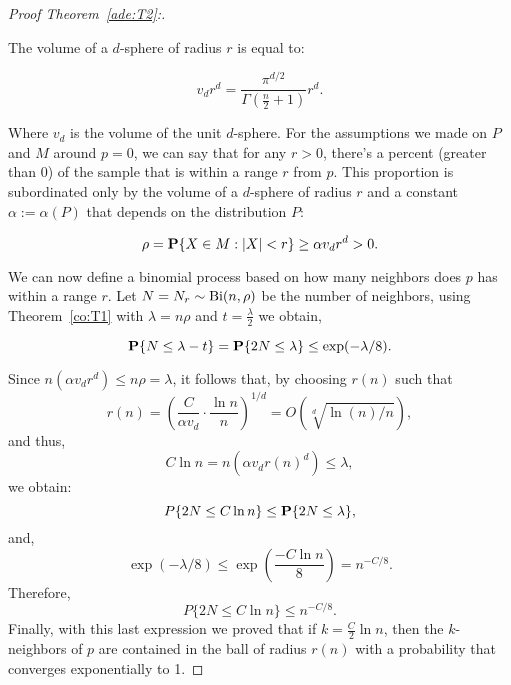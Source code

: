 \begin{proof}[Proof Theorem~\ref{ade:T2}:]\label{ade:T2P}

The volume of a $d$-sphere of radius $r$ is equal to:

\[ v_d r^d = \frac{\pi^{d/2}}{\Gamma(\tfrac{n}{2}+1)} r^d. \]

Where $v_d$ is the volume of the unit $d$-sphere. For the assumptions we made on $P$ and $M$ around $p = 0$, we can say that for any $r > 0$, there's a percent (greater than 0) of the sample that is within a range $r$ from $p$. This proportion is subordinated only by the volume of a $d$-sphere of radius $r$ and a constant $\alpha := \alpha(P)$ that depends on the distribution $P$:

\[ \rho = \P\{X \in M : |X| < r\} \geq \alpha v_d r^d  > 0.  \] 

We can now define a binomial process based on how many neighbors does $p$ has within a range $r$. Let $N = N_r \sim \Bi(n,\rho)$ be the number of neighbors, using Theorem~\ref{co:T1} with $\lambda = n\rho $ and $t = \tfrac{\lambda}{2}$ we obtain,

\[ \P\{N \leq \lambda - t\} = \P\{2N \leq \lambda \} \leq \exp(-\lambda/8). \] 

Since $n(\alpha v_d r^d) \leq n\rho = \lambda$, it follows that, by choosing $r(n)$ such that 
\[ \tag*{($\star$)} r(n) = {\left(\frac{C}{\alpha v_d} \cdot \frac{\ln n}{n} \right)}^{1/d} = O(\sqrt[d]{\ln(n)/n}),\]
and thus,
\[ C \ln n = n(\alpha v_d r{(n)}^d) \leq \lambda,\]
we obtain:
\[P\{2N \leq C \ln n \} \leq \P\{2N \leq \lambda \}, \]
and,
\[\exp(-\lambda/8)  \leq  \exp\left(\frac{-C\ln n}{8}\right) = n^{-C/8}.\]
Therefore,
\[P\{2N \leq C \ln n \} \leq  n^{-C/8}.\]
Finally, with this last expression we proved that if $k = \tfrac{C}{2}\ln n$, then the $k$-neighbors of $p$ are contained in the ball of radius $r(n)$ with a probability that converges exponentially to 1.
\end{proof}
